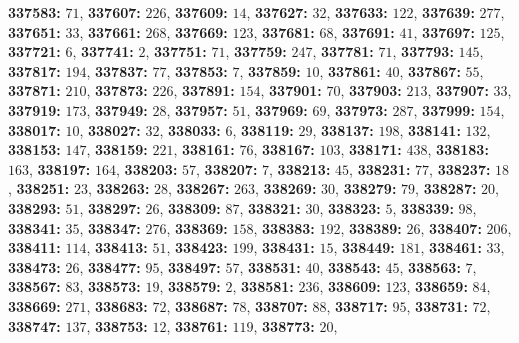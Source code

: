 \textsf{\bfseries 337583:} $71$, \textsf{\bfseries 337607:} $226$, \textsf{\bfseries 337609:} $14$, \textsf{\bfseries 337627:} $32$, \textsf{\bfseries 337633:} $122$, \textsf{\bfseries 337639:} $277$, \textsf{\bfseries 337651:} $33$, \textsf{\bfseries 337661:} $268$, \textsf{\bfseries 337669:} $123$, \textsf{\bfseries 337681:} $68$, \textsf{\bfseries 337691:} $41$, \textsf{\bfseries 337697:} $125$, \textsf{\bfseries 337721:} $6$, \textsf{\bfseries 337741:} $2$, \textsf{\bfseries 337751:} $71$, \textsf{\bfseries 337759:} $247$, \textsf{\bfseries 337781:} $71$, \textsf{\bfseries 337793:} $145$, \textsf{\bfseries 337817:} $194$, \textsf{\bfseries 337837:} $77$, \textsf{\bfseries 337853:} $7$, \textsf{\bfseries 337859:} $10$, \textsf{\bfseries 337861:} $40$, \textsf{\bfseries 337867:} $55$, \textsf{\bfseries 337871:} $210$, \textsf{\bfseries 337873:} $226$, \textsf{\bfseries 337891:} $154$, \textsf{\bfseries 337901:} $70$, \textsf{\bfseries 337903:} $213$, \textsf{\bfseries 337907:} $33$, \textsf{\bfseries 337919:} $173$, \textsf{\bfseries 337949:} $28$, \textsf{\bfseries 337957:} $51$, \textsf{\bfseries 337969:} $69$, \textsf{\bfseries 337973:} $287$, \textsf{\bfseries 337999:} $154$, \textsf{\bfseries 338017:} $10$, \textsf{\bfseries 338027:} $32$, \textsf{\bfseries 338033:} $6$, \textsf{\bfseries 338119:} $29$, \textsf{\bfseries 338137:} $198$, \textsf{\bfseries 338141:} $132$, \textsf{\bfseries 338153:} $147$, \textsf{\bfseries 338159:} $221$, \textsf{\bfseries 338161:} $76$, \textsf{\bfseries 338167:} $103$, \textsf{\bfseries 338171:} $438$, \textsf{\bfseries 338183:} $163$, \textsf{\bfseries 338197:} $164$, \textsf{\bfseries 338203:} $57$, \textsf{\bfseries 338207:} $7$, \textsf{\bfseries 338213:} $45$, \textsf{\bfseries 338231:} $77$, \textsf{\bfseries 338237:} $18$, \textsf{\bfseries 338251:} $23$, \textsf{\bfseries 338263:} $28$, \textsf{\bfseries 338267:} $263$, \textsf{\bfseries 338269:} $30$, \textsf{\bfseries 338279:} $79$, \textsf{\bfseries 338287:} $20$, \textsf{\bfseries 338293:} $51$, \textsf{\bfseries 338297:} $26$, \textsf{\bfseries 338309:} $87$, \textsf{\bfseries 338321:} $30$, \textsf{\bfseries 338323:} $5$, \textsf{\bfseries 338339:} $98$, \textsf{\bfseries 338341:} $35$, \textsf{\bfseries 338347:} $276$, \textsf{\bfseries 338369:} $158$, \textsf{\bfseries 338383:} $192$, \textsf{\bfseries 338389:} $26$, \textsf{\bfseries 338407:} $206$, \textsf{\bfseries 338411:} $114$, \textsf{\bfseries 338413:} $51$, \textsf{\bfseries 338423:} $199$, \textsf{\bfseries 338431:} $15$, \textsf{\bfseries 338449:} $181$, \textsf{\bfseries 338461:} $33$, \textsf{\bfseries 338473:} $26$, \textsf{\bfseries 338477:} $95$, \textsf{\bfseries 338497:} $57$, \textsf{\bfseries 338531:} $40$, \textsf{\bfseries 338543:} $45$, \textsf{\bfseries 338563:} $7$, \textsf{\bfseries 338567:} $83$, \textsf{\bfseries 338573:} $19$, \textsf{\bfseries 338579:} $2$, \textsf{\bfseries 338581:} $236$, \textsf{\bfseries 338609:} $123$, \textsf{\bfseries 338659:} $84$, \textsf{\bfseries 338669:} $271$, \textsf{\bfseries 338683:} $72$, \textsf{\bfseries 338687:} $78$, \textsf{\bfseries 338707:} $88$, \textsf{\bfseries 338717:} $95$, \textsf{\bfseries 338731:} $72$, \textsf{\bfseries 338747:} $137$, \textsf{\bfseries 338753:} $12$, \textsf{\bfseries 338761:} $119$, \textsf{\bfseries 338773:} $20$, 

